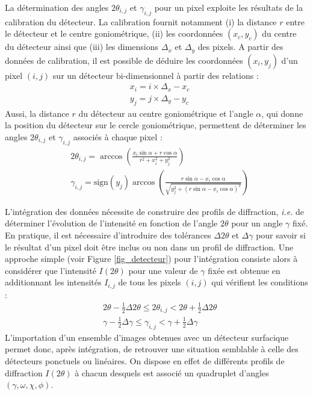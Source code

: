 \documentclass[french,a4paper]{report}
\begin{document}
La détermination des angles $2 \theta_{i,j}$ et $\gamma_{i,j}$ pour un pixel exploite les résultats de la calibration du détecteur. La calibration fournit notamment (i) la distance $r$ entre le détecteur et le centre goniométrique, (ii) les coordonnées $(x_c, y_c) $ du centre du détecteur ainsi que (iii) les dimensions $\Delta_x$ et $\Delta_y$ des pixels. A partir des données de calibration, il est possible de déduire les coordonnées $(x_i,y_j)$ d'un pixel $(i,j)$ sur un détecteur bi-dimensionnel à partir des relations :
\begin{align}
&x_{i}= i \times \Delta_x - x_c\\
&y_{j}= j \times \Delta_y-y_c
\end{align}
Aussi, la distance $r$ du détecteur au centre goniométrique et l'angle $\alpha$, qui donne la position du détecteur sur le cercle goniométrique, permettent de déterminer les angles $2 \theta_{i,j}$ et $\gamma_{i,j}$ associés à chaque pixel :
\begin{align}
&2 \theta_{i,j}  = \arccos \left( \frac{x_i \sin \alpha + r \cos \alpha}{r^2+x_i^2+y_j^2} \right) \\
&\gamma_{i,j}  = \text{sign} \left( y_{j}  \right)\arccos \left(  \frac{r \sin \alpha-x_{i} \cos \alpha }{\sqrt{y_{j}^2+(r \sin \alpha-x_{i} \cos \alpha)^2 }} \right)
\end{align}

L'intégration des données nécessite de construire des profils de diffraction, \textit{i.e.} de déterminer l'évolution de l'intensité en fonction de l'angle $2\theta$ pour un angle $\gamma$ fixé. En pratique, il est nécessaire d'introduire des tolérances $\Delta 2 \theta$ et $\Delta \gamma$ pour savoir si le résultat d'un pixel doit être inclus ou non dans un profil de diffraction. Une approche simple (voir Figure \ref{fig_detecteur}) pour l'intégration consiste alors à considérer que l'intensité $I (2 \theta  )$ pour une valeur de $\gamma$ fixée est obtenue en additionnant les intensités $I_{i,j}$ de tous les pixels $(i,j)$ qui vérifient les conditions :
\begin{align}
&2 \theta- \frac{1}{2} \Delta 2 \theta \leq 2 \theta_{i,j}  < 2 \theta+ \frac{1}{2} \Delta 2 \theta \\
&\gamma- \frac{1}{2} \Delta \gamma \leq \gamma_{i,j}  < \gamma+ \frac{1}{2} \Delta \gamma 
\end{align}
L'importation d'un ensemble d'images obtenues avec un détecteur surfacique permet donc, après intégration, de retrouver une situation semblable à celle des détecteurs ponctuels ou linéaires. On dispose en effet de différents profils de diffraction $I (2 \theta  )$ à chacun desquels est associé un quadruplet d'angles $(\gamma,\omega,\chi,\phi)$.
\end{document}
